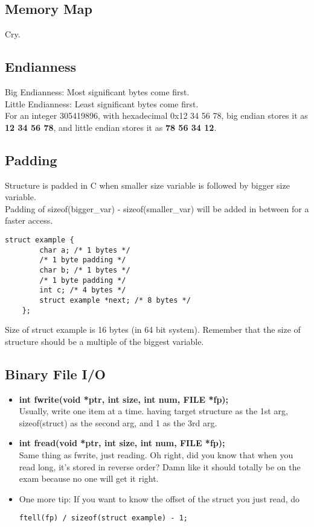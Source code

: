\documentclass{article}
\begin{document}
\subsection{Memory Map}
Cry.

\subsection{Endianness}
Big Endianness: Most significant bytes come first.\\ 
Little Endianness: Least significant bytes come first.\\
For an integer 305419896, with hexadecimal 0x12 34 56 78, big endian stores it as \textbf{12 34 56 78}, and little endian stores it as \textbf{78 56 34 12}.

\subsection{Padding}
Structure is padded in C when smaller size variable is followed by bigger size variable.\\
Padding of sizeof(bigger\_var) - sizeof(smaller\_var) will be added in between for a faster access.
\begin{lstlisting}[style=CStyle]
    struct example {
        char a; /* 1 bytes */
        /* 1 byte padding */
        char b; /* 1 bytes */
        /* 1 byte padding */
        int c; /* 4 bytes */
        struct example *next; /* 8 bytes */
    };
\end{lstlisting}
Size of struct example is 16 bytes (in 64 bit system). Remember that the size of structure should be a multiple of the biggest variable.

\subsection{Binary File I/O}
\begin{itemize}
    \item \textbf{int fwrite(void *ptr, int size, int num, FILE *fp);}\\
    Usually, write one item at a time. having target structure as the 1st arg, sizeof(struct) as the second arg, and 1 as the 3rd arg.
    \item \textbf{int fread(void *ptr, int size, int num, FILE *fp);}\\
    Same thing as fwrite, just reading. Oh right, did you know that when you read long, it's stored in reverse order? Damn like it should totally be on the exam because no one will get it right.
    \item One more tip: If you want to know the offset of the struct you just read, do
    \begin{lstlisting}[style=CStyle]
        ftell(fp) / sizeof(struct example) - 1;
    \end{lstlisting}
\end{itemize}
\end{document}
